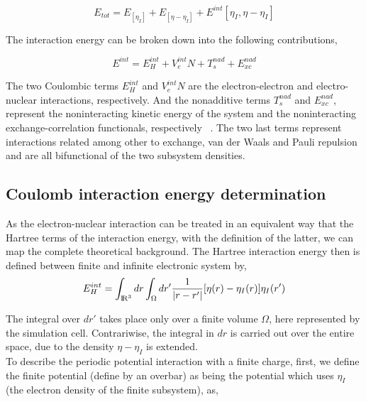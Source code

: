 \documentclass[12pt,a4paper]{article}
\begin{document}
\begin{equation}
	E_{tot} = {E_[{\eta}_I]} + {E_[{\eta} - {\eta}_I]} + {E^{int}[{\eta}_I, {\eta} - {\eta}_I] } 
\end{equation}

The interaction energy can be broken down into the following contributions,

\begin{equation}
	E^{int} = E^{int}_H + V^{int}_eN + T^{nad}_s + E^{nad}_{xc} 
\end{equation}

The two Coulombic terms $E^{int}_H$ and $V^{int}_eN$ are the electron-electron and electro-nuclear interactions, respectively. And the
nonadditive terms $T^{nad}_s$ and $E^{nad}_{xc}$, represent the noninteracting kinetic energy of the system and the noninteracting
exchange-correlation functionals, respectively ~\cite{krishtal2015subsystem}. The two last terms represent interactions related among other to exchange, van der Waals and Pauli repulsion and are all bifunctional of the two subsystem densities. \\

\subsection{Coulomb interaction energy determination}

As the electron-nuclear interaction can be treated in an equivalent way that the Hartree terms of the interaction energy, with the definition of
the latter, we can map the complete theoretical background. The Hartree interaction energy then is defined between finite and infinite
electronic system by, \\

\begin{equation}
	E^{int}_H = \int_{{\rm I\!R}^3} dr \int_{\Omega} dr' \frac{1}{|r-r'|} [\eta(r)-\eta_{I}(r)]\eta_{I}(r') 
\end{equation}

The integral over $dr'$ takes place only over a finite volume $\Omega$, here represented by the simulation cell. Contrariwise, the integral in $dr$
is carried out over the entire space, due to the density $\eta -\eta_{I}$ is extended. \\

To describe the periodic potential interaction with a finite charge, first, we define the finite potential (define by an overbar) as being the potential which uses $\eta_{I}$ (the electron density of the finite subsystem), as, \\
\end{document}
